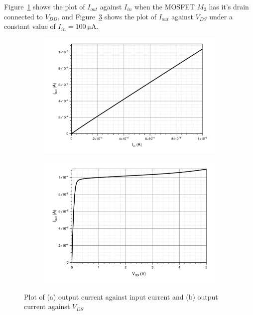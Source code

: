 \documentclass[12pt]{article}   %
\begin{document}
	Figure~\ref{fig:ioutIin} shows the plot of $I_{out}$ against $I_{in}$ when the MOSFET $M_2$ has it's drain connected to $V_{DD}$, and Figure~\ref{fig:ioutVgs} shows the plot of $I_{out}$ against $V_{DS}$ under a constant value of $I_{in} = \SI{100}{\micro\ampere}$.
	
	\begin{figure}[htbp]
		\centering
		\begin{subfigure}{0.48\linewidth}
			\includegraphics[width=\linewidth]{Figures/E3_Current_Mirror/Iin_Iout}
			\caption{}
			\label{fig:ioutIin}
		\end{subfigure}
		\begin{subfigure}{0.48\linewidth}
			\includegraphics[width=\linewidth]{Figures/E3_Current_Mirror/Iout_Vds}
			\caption{}
			\label{fig:ioutVgs}
		\end{subfigure}
		\caption{Plot of (a) output current against input current and (b) output current against $V_{DS}$}
	\end{figure}
	
\end{document}
